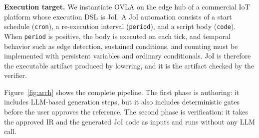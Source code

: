 \documentclass[sigconf,nonacm,anonymous,review]{acmart}
\begin{document}
\textbf{Execution target.} We instantiate OVLA on the edge hub of a commercial IoT platform whose execution DSL is JoI. A JoI automation consists of a start schedule (\texttt{cron}), a re-execution interval (\texttt{period}), and a script body (\texttt{code}). When \texttt{period} is positive, the body is executed on each tick, and temporal behavior such as edge detection, sustained conditions, and counting must be implemented with persistent variables and ordinary conditionals. JoI is therefore the executable artifact produced by lowering, and it is the artifact checked by the verifier.

Figure~\ref{fig:arch} shows the complete pipeline. The first phase is authoring: it includes LLM-based generation steps, but it also includes deterministic gates before the user approves the reference. The second phase is verification: it takes the approved IR and the generated JoI code as inputs and runs without any LLM call.
\end{document}
